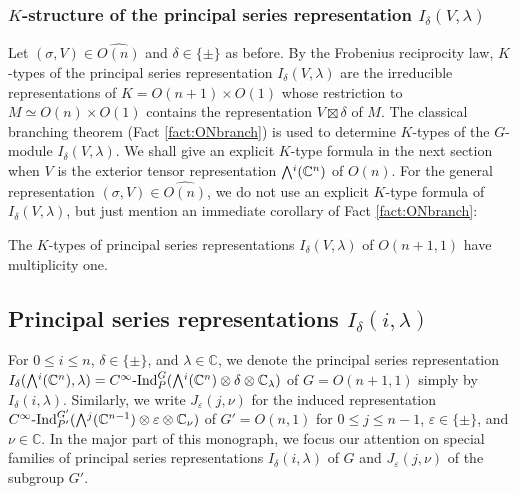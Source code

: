 \subsubsection{$K$-structure of the principal series representation
 $I_{\delta}(V,\lambda)$}
\label{subsec:KstrI}
Let $(\sigma,V) \in \widehat {O(n)}$
 and $\delta \in \{\pm\}$ as before.  
By the Frobenius reciprocity law, 
 $K$-types of the principal series representation $I_\delta({V},\lambda)$
 are the irreducible representations
 of $K=O(n+1) \times  O(1)$
 whose restriction to $M \simeq O(n)\times O(1)$ contains the representation
 $V\boxtimes \delta$ of $M$.  
The classical branching theorem (Fact \ref{fact:ONbranch}) is used
 to determine $K$-types of the $G$-module $I_{\delta}(V,\lambda)$.  
We shall give an explicit $K$-type formula
 in the next section
 when $V$ is the exterior tensor representation $\Exterior^i({\mathbb{C}}^n)$
 of $O(n)$.  
For the general representation $(\sigma,V) \in \widehat {O(n)}$, 
 we do not use an explicit $K$-type formula of $I_{\delta}(V,\lambda)$, 
 but just mention an immediate corollary of Fact \ref{fact:ONbranch}:
\begin{proposition}
The $K$-types of principal series representations $I_{\delta}(V,\lambda)$
 of $O(n+1,1)$ have multiplicity one.  
\end{proposition}







\subsection{Principal series representations $I_{\delta}(i, \lambda)$}
\label{subsec:irred}
For $0 \le i \le n$, 
 $\delta \in \{\pm\}$, 
 and $\lambda \in {\mathbb{C}}$, 
 we denote the principal series representation 
 $I_\delta (\Exterior^i({\mathbb{C}}^n),\lambda)
 =
 C^{\infty}{\text{-}}{\operatorname{Ind}}_P^G(\Exterior^i({\mathbb{C}}^n)\otimes \delta \otimes {\mathbb{C}}_{\lambda})$
 of $G=O(n+1,1)$ simply by 
$I_\delta(i,\lambda)$.  
Similarly,
 we write 
$J_{\varepsilon}(j,\nu)$
 for the induced representation
 $C^{\infty}{\operatorname{-Ind}}_{P'}^{G'}(\Exterior^j({\mathbb{C}}^{n-1}) \otimes {\varepsilon} \otimes {\mathbb{C}}_{\nu})$
 of $G'=O(n,1)$ 
 for $0 \le j \le n-1$, 
 $\varepsilon \in \{\pm\}$, 
 and $\nu \in {\mathbb{C}}$. 
In the major part of this monograph, 
 we focus our attention on special families of principal series representations
 $I_\delta(i,\lambda)$ of $G$
 and $J_{\varepsilon}(j,\nu)$ of the subgroup $G'$. 



